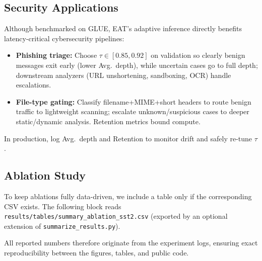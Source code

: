 \documentclass[11pt,letterpaper]{article}
\theoremstyle{plain}
\newcommand{\eat}{\textsc{EAT}}
\begin{document}
\subsection{Security Applications}
\label{sec:securityapps}
Although benchmarked on GLUE, \eat{}'s adaptive inference directly benefits latency-critical cybersecurity pipelines:
\begin{itemize}
  \item \textbf{Phishing triage:} Choose $\tau\!\in\![0.85,0.92]$ on validation so clearly benign messages exit early (lower Avg.\ depth), while uncertain cases go to full depth; downstream analyzers (URL unshortening, sandboxing, OCR) handle escalations.
  \item \textbf{File-type gating:} Classify filename{+}MIME{+}short headers to route benign traffic to lightweight scanning; escalate unknown/suspicious cases to deeper static/dynamic analysis. Retention metrics bound compute.
\end{itemize}
In production, log Avg.\ depth and Retention to monitor drift and safely re-tune $\tau$.

\subsection{Ablation Study}
\label{sec:ablation}
To keep ablations fully data-driven, we include a table only if the corresponding CSV exists.
The following block reads \texttt{results/tables/summary_ablation_sst2.csv} (exported by an optional extension of \texttt{summarize\_results.py}).


All reported numbers therefore originate from the experiment logs,
ensuring exact reproducibility between the figures, tables, and public code.

\end{document}
